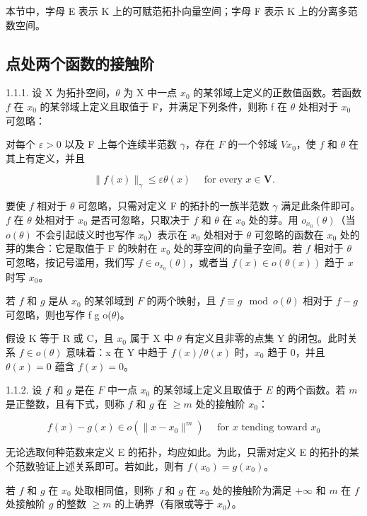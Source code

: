 本节中，字母 E 表示 K 上的可赋范拓扑向量空间；字母 F 表示 K 上的分离多范数空间。

\subsection{点处两个函数的接触阶}

1.1.1. 设 X 为拓扑空间，\(\theta\) 为 X 中一点 \(x_0\) 的某邻域上定义的正数值函数。若函数 \(f\) 在 \(x_0\) 的某邻域上定义且取值于 F，并满足下列条件，则称 f 在 \(\theta\) 处相对于 \(x_0\) 可忽略：

对每个 \(\varepsilon > 0\) 以及 F 上每个连续半范数 \(\gamma\)，存在 \(F\) 的一个邻域 \(V\)\(x_0\)，使 \(f\) 和 \(\theta\) 在其上有定义，并且

\[
\| f (x) \| _ {\gamma} \leqslant \varepsilon \theta (x) \quad \text { for   every } x \in \mathbf {V}.
\]

要使 \(f\) 相对于 \(\theta\) 可忽略，只需对定义 F 的拓扑的一族半范数 \(\gamma\) 满足此条件即可。\(f\) 在 \(\theta\) 处相对于 \(x_{0}\) 是否可忽略，只取决于 \(f\) 和 \(\theta\) 在 \(x_{0}\) 处的芽。用 \(o_{x_{0}}(\theta)\)（当 \(o(\theta)\) 不会引起歧义时也写作 \(x_{0}\)）表示在 \(x_{0}\) 处相对于 \(\theta\) 可忽略的函数在 \(x_{0}\) 处的芽的集合：它是取值于 F 的映射在 \(x_{0}\) 处的芽空间的向量子空间。若 \(f\) 相对于 \(\theta\) 可忽略，按记号滥用，我们写 \(f \in o_{x_{0}}(\theta)\)，或者当 \(f(x) \in o(\theta(x))\) 趋于 \(x\) 时写 \(x_{0}\)。

若 \(f\) 和 \(g\) 是从 \(x_{0}\) 的某邻域到 \(F\) 的两个映射，且 \(f \equiv g \mod o(\theta)\) 相对于 \(f - g\) 可忽略，则也写作 f  g  o(\(\theta\))。

假设 K 等于 R 或 C，且 \(x_{0}\) 属于 X 中 \(\theta\) 有定义且非零的点集 Y 的闭包。此时关系 \(f \in o(\theta)\) 意味着：x 在 Y 中趋于 \(f(x)/\theta(x)\) 时，\(x_{0}\) 趋于 0，并且 \(\theta(x) = 0\) 蕴含 \(f(x) = 0\)。

1.1.2. 设 \(f\) 和 \(g\) 是在 \(F\) 中一点 \(x_0\) 的某邻域上定义且取值于 \(E\) 的两个函数。若 \(m\) 是正整数，且有下式，则称 \(f\) 和 \(g\) 在 \(\geqslant m\) 处的接触阶 \(x_0\)：

\[
f (x) - g (x) \in o (\| x - x _ {0} \| ^ {m}) \quad \text { for } x \text { tending   toward } x _ {0}
\]

无论选取何种范数来定义 E 的拓扑，均应如此。为此，只需对定义 E 的拓扑的某个范数验证上述关系即可。若如此，则有 \(f(x_0) = g(x_0)\)。

若 \(f\) 和 \(g\) 在 \(x_{0}\) 处取相同值，则称 \(f\) 和 \(g\) 在 \(x_{0}\) 处的接触阶为满足 \(+\infty\) 和 \(m\) 在 \(f\) 处接触阶 \(g\) 的整数 \(\geqslant m\) 的上确界（有限或等于 \(x_{0}\)）。

